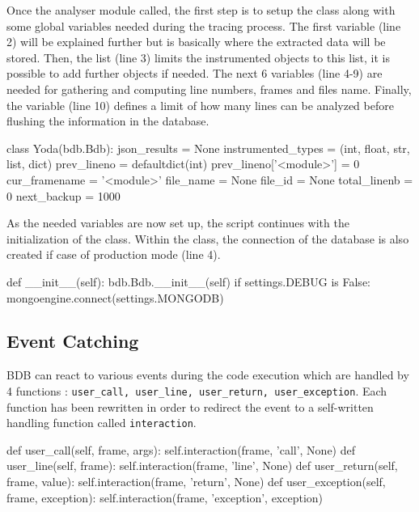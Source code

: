 Once the analyser module called, the first step is to setup the  class along with some global variables needed during the tracing process. The first variable  (line 2) will be explained further but is basically where the extracted data will be stored. Then, the  list (line 3) limits the instrumented objects to this list, it is possible to add further objects if needed. The next 6 variables (line 4-9) are needed for gathering and computing line numbers, frames and files name. Finally, the  variable (line 10) defines a limit of how many lines can be analyzed before flushing the information in the database.

\begin{python}
class Yoda(bdb.Bdb):
    json_results = None
    instrumented_types = (int, float, str, list, dict)
    prev_lineno = defaultdict(int)
    prev_lineno['<module>'] = 0 
    cur_framename = '<module>'
    file_name = None
    file_id = None 
    total_linenb = 0
    next_backup = 1000
\end{python}

As the needed variables are now set up, the script continues with the initialization of the  class. Within the class, the connection of the database is also created if case of production mode (line 4). 

\begin{python}
def __init__(self):
    bdb.Bdb.__init__(self)
    if settings.DEBUG is False:
        mongoengine.connect(settings.MONGODB)
\end{python}

\subsection{Event Catching}

BDB can react to various events during the code execution which are handled by 4 functions : \texttt{user\_call, user\_line, user\_return, user\_exception}. Each function has been rewritten in order to redirect the event to a self-written handling function called \texttt{interaction}. 
\smallskip
\begin{python}
def user_call(self, frame, args):
    self.interaction(frame, 'call', None)
def user_line(self, frame):
    self.interaction(frame, 'line', None)
def user_return(self, frame, value):
    self.interaction(frame, 'return', None)
def user_exception(self, frame, exception):
    self.interaction(frame, 'exception', exception)
\end{python}

